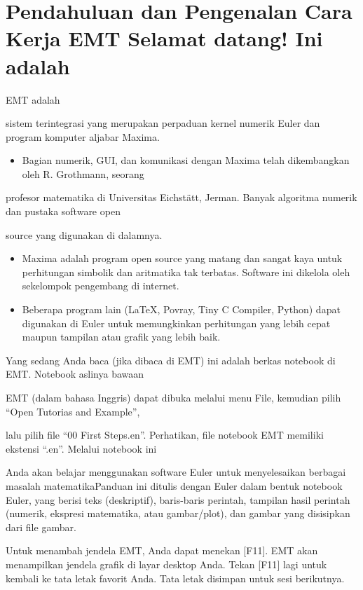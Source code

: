 \documentclass[
]{book}
\author{}
\date{}
\providecommand{\tightlist}{%
  \setlength{\itemsep}{0pt}\setlength{\parskip}{0pt}}
\begin{document}
\frontmatter

\mainmatter
\chapter{Pendahuluan dan Pengenalan Cara Kerja EMT Selamat datang! Ini adalah}\label{pendahuluan-dan-pengenalan-cara-kerja-emt-selamat-datang-ini-adalah}

EMT adalah

sistem terintegrasi yang merupakan perpaduan kernel numerik Euler dan program komputer aljabar Maxima.

\begin{itemize}
\tightlist
\item
  Bagian numerik, GUI, dan komunikasi dengan Maxima telah dikembangkan oleh R. Grothmann, seorang
\end{itemize}

profesor matematika di Universitas Eichstätt, Jerman. Banyak algoritma numerik dan pustaka software open

source yang digunakan di dalamnya.

\begin{itemize}
\item
  Maxima adalah program open source yang matang dan sangat kaya untuk perhitungan simbolik dan aritmatika tak terbatas. Software ini dikelola oleh sekelompok pengembang di internet.
\item
  Beberapa program lain (LaTeX, Povray, Tiny C Compiler, Python) dapat digunakan di Euler untuk memungkinkan perhitungan yang lebih cepat maupun tampilan atau grafik yang lebih baik.
\end{itemize}

Yang sedang Anda baca (jika dibaca di EMT) ini adalah berkas notebook di EMT. Notebook aslinya bawaan

EMT (dalam bahasa Inggris) dapat dibuka melalui menu File, kemudian pilih ``Open Tutorias and Example'',

lalu pilih file ``00 First Steps.en''. Perhatikan, file notebook EMT memiliki ekstensi ``.en''. Melalui notebook ini

Anda akan belajar menggunakan software Euler untuk menyelesaikan berbagai masalah matematikaPanduan ini ditulis dengan Euler dalam bentuk notebook Euler, yang berisi teks (deskriptif), baris-baris perintah, tampilan hasil perintah (numerik, ekspresi matematika, atau gambar/plot), dan gambar yang disisipkan dari file gambar.

Untuk menambah jendela EMT, Anda dapat menekan {[}F11{]}. EMT akan menampilkan jendela grafik di layar desktop Anda. Tekan {[}F11{]} lagi untuk kembali ke tata letak favorit Anda. Tata letak disimpan untuk sesi berikutnya.
\end{document}
